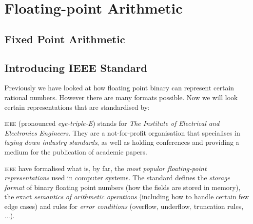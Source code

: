 

\chapter{Floating-point Arithmetic}


\section{Fixed Point Arithmetic}

\begin{figure}[h]
\end{figure}


\section{Introducing IEEE Standard}

Previously we have looked at how floating point binary can represent certain rational numbers. 
However there are many formats possible. 
Now we will look certain representations that are standardised by:


\textsc{ieee} (pronounced \textit{eye-triple-E})
stands for \textit{The Institute of Electrical and Electronics Engineers}. 
They are a not-for-profit organisation that specialises in \textit{laying down industry standards}, 
as well as holding conferences and providing a medium for the publication of academic papers. 

\textsc{ieee} have formalised what is, by far, the \textit{most popular floating-point representations}
used in computer systems. The standard defines the \textit{storage format} of binary floating point numbers 
(how the fields are stored in memory), the exact \textit{semantics of arithmetic operations} (including how to handle 
certain few edge cases) and rules for \textit{error conditions}
(overflow, underflow, truncation rules, ...).



